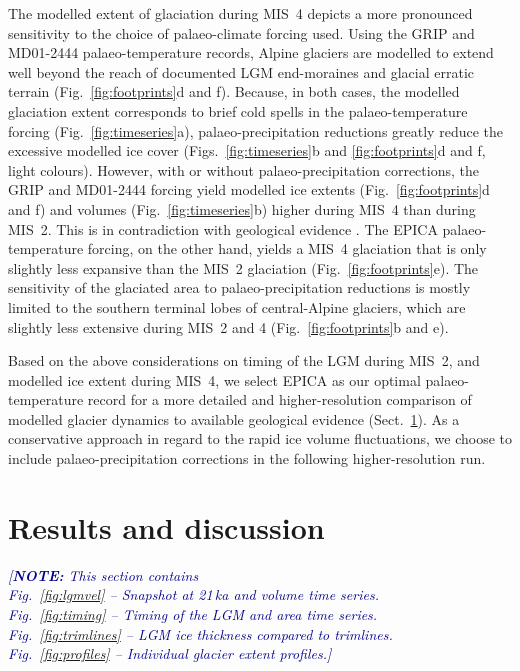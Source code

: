 \documentclass[tc, manuscript]{copernicus}
\newcommand{\note}[1]{\textcolor{darkblue}{\emph{[\textbf{NOTE:} #1]}}}
\begin{document}
    The modelled extent of glaciation during MIS~4 depicts a more pronounced
    sensitivity to the choice of palaeo-climate forcing used. Using the GRIP
    and MD01-2444 palaeo-temperature records, Alpine glaciers are modelled to
    extend well beyond the reach of documented LGM end-moraines and glacial
    erratic terrain (Fig.~\ref{fig:footprints}d and f). Because, in both cases,
    the modelled glaciation extent corresponds to brief cold spells in the
    palaeo-temperature forcing (Fig.~\ref{fig:timeseries}a),
    palaeo-precipitation reductions greatly reduce the excessive modelled ice
    cover (Figs.~\ref{fig:timeseries}b and \ref{fig:footprints}d and f, light
    colours). However, with or without palaeo-precipitation corrections,
    the GRIP and MD01-2444 forcing yield
    modelled ice extents (Fig.~\ref{fig:footprints}d and f) and volumes
    (Fig.~\ref{fig:timeseries}b) higher during MIS~4 than
    during MIS~2. This is in contradiction with geological evidence
    \citep{Preusser.2004, Ivy-Ochs.etal.2008}.
    The EPICA palaeo-temperature forcing, on the other hand, yields a MIS~4
    glaciation that is only slightly less expansive than the MIS~2 glaciation
    (Fig.~\ref{fig:footprints}e). The sensitivity of the glaciated area to
    palaeo-precipitation reductions is mostly limited to the southern terminal
    lobes of central-Alpine glaciers, which are slightly less extensive during
    MIS~2 and 4 (Fig.~\ref{fig:footprints}b and e).

    Based on the above considerations on timing of the LGM during MIS~2, and
    modelled ice
    extent during MIS~4, we select EPICA as our optimal palaeo-temperature
    record for a more detailed and higher-resolution comparison of modelled
    glacier dynamics to available geological evidence
    (Sect.~\ref{sec:results}). As a conservative approach in regard to the
    rapid ice volume fluctuations, we choose to include palaeo-precipitation
    corrections in the following higher-resolution run.


\section{Results and discussion}
\label{sec:results}

    \note{This section contains\\
        Fig.~\ref{fig:lgmvel} -- Snapshot at 21\,ka and volume time series.\\
        Fig.~\ref{fig:timing} -- Timing of the LGM and area time series.\\
        Fig.~\ref{fig:trimlines} -- LGM ice thickness compared to trimlines.\\
        Fig.~\ref{fig:profiles} -- Individual glacier extent profiles.}
\end{document}
